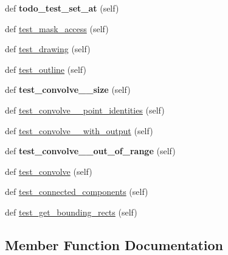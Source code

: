 \begin{DoxyCompactItemize}
def {\bfseries todo\+\_\+test\+\_\+set\+\_\+at} (self)
\item 
def \hyperlink{classpygame_1_1tests_1_1mask__test_1_1_mask_type_test_ad4f4b2bfd2ae6516b3ff3b8cebc5ae85}{test\+\_\+mask\+\_\+access} (self)
\item 
def \hyperlink{classpygame_1_1tests_1_1mask__test_1_1_mask_type_test_a1344bf26364bd4763b1cc7519b8c68ea}{test\+\_\+drawing} (self)
\item 
def \hyperlink{classpygame_1_1tests_1_1mask__test_1_1_mask_type_test_a511f168691f548401b62928fe747ffb3}{test\+\_\+outline} (self)
\item 
\mbox{\label{classpygame_1_1tests_1_1mask__test_1_1_mask_type_test_a9ab179bfbfc6ab7ecfce12fc8af222ef}} 
def {\bfseries test\+\_\+convolve\+\_\+\+\_\+size} (self)
\item 
def \hyperlink{classpygame_1_1tests_1_1mask__test_1_1_mask_type_test_aef241c6457d705a00ec2b0e97ef40d11}{test\+\_\+convolve\+\_\+\+\_\+point\+\_\+identities} (self)
\item 
def \hyperlink{classpygame_1_1tests_1_1mask__test_1_1_mask_type_test_ab04f4f2e233ad7941041247fb73bed52}{test\+\_\+convolve\+\_\+\+\_\+with\+\_\+output} (self)
\item 
\mbox{\label{classpygame_1_1tests_1_1mask__test_1_1_mask_type_test_a81d4106e5c37d6f87ff8d11e25d30419}} 
def {\bfseries test\+\_\+convolve\+\_\+\+\_\+out\+\_\+of\+\_\+range} (self)
\item 
def \hyperlink{classpygame_1_1tests_1_1mask__test_1_1_mask_type_test_a4414fa084bbf301e0492a784a8bf015e}{test\+\_\+convolve} (self)
\item 
def \hyperlink{classpygame_1_1tests_1_1mask__test_1_1_mask_type_test_aaae81eb779312ea78a34b5a165cfefac}{test\+\_\+connected\+\_\+components} (self)
\item 
def \hyperlink{classpygame_1_1tests_1_1mask__test_1_1_mask_type_test_a82652fabefc2926ab8fed55d6d33e01e}{test\+\_\+get\+\_\+bounding\+\_\+rects} (self)
\end{DoxyCompactItemize}


\subsection{Member Function Documentation}
\mbox{\label{classpygame_1_1tests_1_1mask__test_1_1_mask_type_test_aaae81eb779312ea78a34b5a165cfefac}} 
